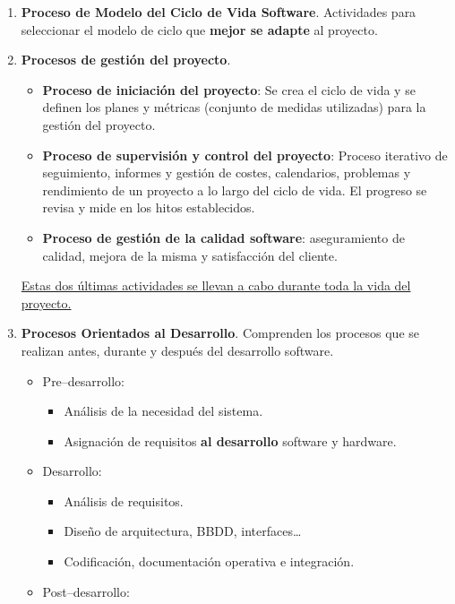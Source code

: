 \begin{enumerate}
    \item \textbf{Proceso de Modelo del Ciclo de Vida Software}.  Actividades para seleccionar el modelo de ciclo que \textbf{mejor se adapte} al proyecto.
    \item \textbf{Procesos de gestión del proyecto}.
          \begin{itemize}
              \item \textbf{Proceso de iniciación del proyecto}: Se crea el ciclo de vida y se definen los planes y métricas (conjunto de medidas utilizadas) para la gestión del proyecto.
              \item \textbf{Proceso de supervisión y control del proyecto}: Proceso iterativo de seguimiento, informes y gestión de costes, calendarios, problemas y rendimiento de un proyecto a lo largo del ciclo de vida. El progreso se revisa y mide en los hitos establecidos.
              \item \textbf{Proceso de gestión de la calidad software}: aseguramiento de calidad, mejora de la misma y satisfacción del cliente.
          \end{itemize}
          \uline{Estas dos últimas actividades se llevan a cabo durante toda la vida del proyecto.}
    \item \textbf{Procesos Orientados al Desarrollo}. Comprenden los procesos que se realizan antes, durante y después del desarrollo software.
          \begin{itemize}
              \item Pre--desarrollo:
                    \begin{itemize}
                        \item Análisis de la necesidad del sistema.
                        \item Asignación de requisitos \textbf{al desarrollo} software y hardware.
                    \end{itemize}
              \item Desarrollo:
                    \begin{itemize}
                        \item Análisis de requisitos.
                        \item Diseño de arquitectura, BBDD, interfaces\ldots
                        \item Codificación, documentación operativa e integración.
                    \end{itemize}
              \item Post--desarrollo:

\end{itemize}
\end{enumerate}
